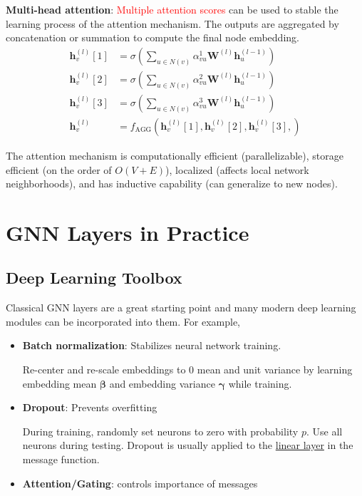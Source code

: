 \documentclass[12pt]{article}
\newcommand{\tbf}{\textbf}
\newcommand{\uline}{\underline}
\newcommand{\tcR}{\textcolor{red}}
\newcommand{\mbf}{\mathbf}
\begin{document}
\medskip
\tbf{Multi-head attention}: \tcR{Multiple attention scores} can be used to
stable the learning process of the attention mechanism. The outputs are
aggregated by concatenation or summation to compute the final node embedding.
\begin{align*}
  \mbf{h}_v^{(l)}[1] &= \sigma(\sum_{u \in N(v)} \alpha_{vu}^1
  \mbf{W}^{(l)}\mbf{h}_u^{(l-1)}) \\
  \mbf{h}_v^{(l)}[2] &= \sigma(\sum_{u \in N(v)} \alpha_{vu}^2
  \mbf{W}^{(l)}\mbf{h}_u^{(l-1)}) \\
  \mbf{h}_v^{(l)}[3] &= \sigma(\sum_{u \in N(v)} \alpha_{vu}^3
  \mbf{W}^{(l)}\mbf{h}_u^{(l-1)}) \\
  \mbf{h}_v^{(l)} &=
  f_{\text{AGG}}(\mbf{h}_v^{(l)}[1],\mbf{h}_v^{(l)}[2],\mbf{h}_v^{(l)}[3],)
\end{align*}

The attention mechanism is computationally efficient (parallelizable), storage
efficient (on the order of $O(V+E)$), localized (affects local network
neighborhoods), and has inductive capability (can generalize to new nodes).

\section*{GNN Layers in Practice}

\subsection*{Deep Learning Toolbox}

Classical GNN layers are a great starting point and many modern deep learning
modules can be incorporated into them. For example,
\begin{itemize}
  \itemsep0em
  \item \tbf{Batch normalization}: Stabilizes neural network training.

    Re-center and re-scale embeddings to 0 mean and unit variance by learning
    embedding mean $\bm{\beta}$ and embedding variance $\bm{\gamma}$ while
    training.
  \item \tbf{Dropout}: Prevents overfitting

    During training, randomly set neurons to zero with probability $p$. Use all
    neurons during testing. Dropout is usually applied to the \uline{linear
    layer} in the message function.
  \item \tbf{Attention/Gating}: controls importance of messages
\end{itemize}
\end{document}
